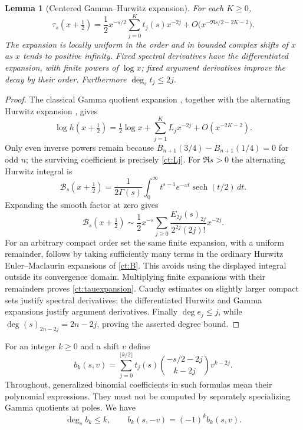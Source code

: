 \documentclass[11pt,letterpaper]{article}
\numberwithin{equation}{section}
\newtheorem{lemma}[theorem]{Lemma}
\theoremstyle{definition}
\theoremstyle{remark}
\begin{document}
\begin{lemma}[Centered Gamma--Hurwitz expansion]\label{ct:centered}
For each $K\ge0$,
\begin{equation}\label{ct:tauexpansion}
 \tau_s(x+\tfrac12)=\frac12x^{-s/2}
       \sum_{j=0}^Kt_j(s)x^{-2j}
       +O\bigl(x^{-\Re s/2-2K-2}\bigr).
\end{equation}
The expansion is locally uniform in the order and in bounded complex
shifts of $x$ as $x$ tends to positive infinity. Fixed spectral derivatives
have the differentiated expansion, with finite powers of $\log x$;
fixed argument derivatives improve the decay by their order.
Furthermore $\deg_s t_j\le2j$.
\end{lemma}
\begin{proof}
The classical Gamma quotient expansion \cite{DLMF}, together with the alternating Hurwitz expansion \cite{HuKim}, gives
\[
 \log h(x+\tfrac12)=\tfrac12\log x+
                 \sum_{j=1}^K L_jx^{-2j}+O(x^{-2K-2}).
\]
Only even inverse powers remain because
$B_{n+1}(3/4)-B_{n+1}(1/4)=0$ for odd $n$; the surviving coefficient
is precisely \eqref{ct:Lj}. For $\Re s>0$ the alternating Hurwitz
integral is
\[
 \mathcal B_s(x+\tfrac12)=\frac1{2\Gamma(s)}
  \int_0^\infty t^{s-1}e^{-xt}\operatorname{sech}(t/2)\,dt.
\]
Expanding the smooth factor at zero gives
\[
 \mathcal B_s(x+\tfrac12)\sim\frac12x^{-s}
        \sum_{j\ge0}\frac{E_{2j}(s)_{2j}}{2^{2j}(2j)!}x^{-2j}.
\]
For an arbitrary compact order set the same finite expansion, with a
uniform remainder, follows by taking sufficiently many terms in the
ordinary Hurwitz Euler--Maclaurin expansions of \eqref{ct:B}. This avoids
using the displayed integral outside its convergence domain. Multiplying
finite expansions with their remainders proves \eqref{ct:tauexpansion}.
Cauchy estimates on slightly larger compact sets justify spectral
 derivatives; the differentiated Hurwitz and Gamma expansions justify
argument derivatives. Finally $\deg e_j\le j$, while
$\deg(s)_{2n-2j}=2n-2j$, proving the asserted degree bound.
\end{proof}

For an integer $k\ge0$ and a shift $v$ define
\begin{equation}\label{ct:bk}
 b_k(s,v)=\sum_{j=0}^{\lfloor k/2\rfloor}
 t_j(s)\binom{-s/2-2j}{k-2j}v^{k-2j}.
\end{equation}
Throughout, generalized binomial coefficients in such formulas mean their
polynomial expressions. They must not be computed by separately
specializing Gamma quotients at poles. We have
\begin{equation}\label{ct:b-properties}
 \deg_s b_k\le k,\qquad b_k(s,-v)=(-1)^kb_k(s,v).
\end{equation}
\end{document}
